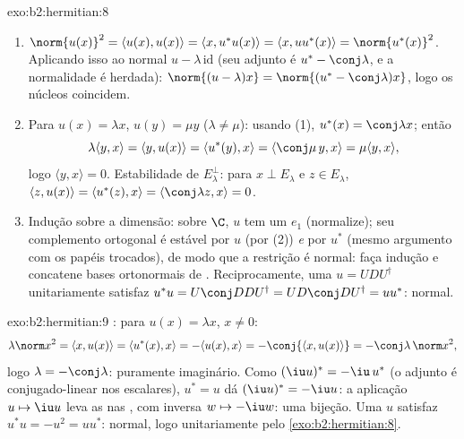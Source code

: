 \begin{solution}{exo:b2:hermitian:8}
\begin{enumerate}
  \item $\norm{u(x)}^2 = \langle u(x), u(x)\rangle = \langle x,
        u^*u(x)\rangle = \langle x, uu^*(x)\rangle =
        \norm{u^*(x)}^2$. Aplicando isso ao normal $u -
        \lambda\,\mathrm{id}$ (seu adjunto é $u^* -
        \conj\lambda$, e a normalidade é herdada): $\norm{(u -
        \lambda)x} = \norm{(u^* - \conj\lambda)x}$, logo os núcleos
        coincidem.
  \item Para  $u(x) = \lambda x$, $u(y) = \mu y$
        ($\lambda \neq \mu$): usando (1), $u^*(x) = \conj\lambda x$;
        então
        \[
        \lambda\langle y, x\rangle = \langle y, u(x)\rangle
        = \langle u^*(y), x\rangle = \langle \conj\mu\, y, x\rangle
        = \mu \langle y, x\rangle ,
        \]
        logo $\langle y, x\rangle = 0$. Estabilidade de $E_\lambda^\perp$:
        para $x \perp E_\lambda$ e $z \in E_\lambda$, $\langle z,
        u(x)\rangle = \langle u^*(z), x\rangle =
        \langle\conj\lambda z, x\rangle = 0$.
  \item Indução sobre a dimensão: sobre $\C$, $u$ tem um 
        $e_1$ (normalize); seu complemento ortogonal é estável
        por $u$ (por (2)) \emph{e} por $u^*$ (mesmo argumento
        com os papéis trocados), de modo que a restrição é normal: faça indução
        e concatene bases ortonormais de . Reciprocamente, uma
        $u = UDU^\dagger$ unitariamente  satisfaz $u^*u
        = U\conj D D U^\dagger = U D\conj D U^\dagger = uu^*$:
        normal.
\end{enumerate}
\end{solution}

\begin{solution}{exo:b2:hermitian:9}
: para $u(x) = \lambda x$, $x \neq 0$:
\[
\lambda\norm x^2 = \langle x, u(x)\rangle
= \langle u^*(x), x\rangle = -\langle u(x), x\rangle
= -\conj{\langle x, u(x)\rangle} = -\conj\lambda\,\norm x^2 ,
\]
logo $\lambda = -\conj\lambda$: puramente imaginário. Como $(\iu
u)^* = -\iu\,u^*$ (o adjunto é conjugado-linear nos escalares),
$u^* = u$ dá $(\iu u)^* = -\iu u$: a aplicação $u \mapsto \iu u$
leva as  nas , com inversa $w \mapsto -\iu
w$: uma bijeção. Uma $u$  satisfaz $u^*u = -u^2 =
uu^*$: normal, logo unitariamente  pelo
\cref{exo:b2:hermitian:8}.
\end{solution}

